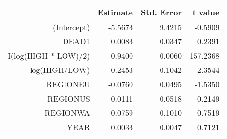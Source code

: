 \begin{table}[ht]
\centering
\begin{tabular}{rrrr}
  \hline
 & Estimate & Std. Error & t value \\ 
  \hline
(Intercept) & -5.5673 & 9.4215 & -0.5909 \\ 
  DEAD1 & 0.0083 & 0.0347 & 0.2391 \\ 
  I(log(HIGH * LOW)/2) & 0.9400 & 0.0060 & 157.2368 \\ 
  log(HIGH/LOW) & -0.2453 & 0.1042 & -2.3544 \\ 
  REGIONEU & -0.0760 & 0.0495 & -1.5350 \\ 
  REGIONUS & 0.0111 & 0.0518 & 0.2149 \\ 
  REGIONWA & 0.0759 & 0.1010 & 0.7519 \\ 
  YEAR & 0.0033 & 0.0047 & 0.7121 \\ 
   \hline
\end{tabular}
\end{table}
